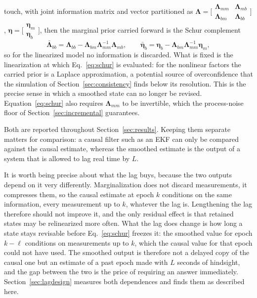 \documentclass{IEEEtaes}
\begin{document}
touch, with joint information matrix and vector partitioned as
$\boldsymbol{\Lambda}=\big[\begin{smallmatrix}\boldsymbol{\Lambda}_{mm}&\boldsymbol{\Lambda}_{mb}\\
\boldsymbol{\Lambda}_{bm}&\boldsymbol{\Lambda}_{bb}\end{smallmatrix}\big]$,
$\boldsymbol{\eta}=\big[\begin{smallmatrix}\boldsymbol{\eta}_m\\
\boldsymbol{\eta}_b\end{smallmatrix}\big]$, then the marginal prior carried
forward is the Schur complement
\begin{equation}
\bar{\boldsymbol{\Lambda}}_{bb}
=\boldsymbol{\Lambda}_{bb}
-\boldsymbol{\Lambda}_{bm}\boldsymbol{\Lambda}_{mm}^{-1}\boldsymbol{\Lambda}_{mb},
\qquad
\bar{\boldsymbol{\eta}}_{b}
=\boldsymbol{\eta}_{b}
-\boldsymbol{\Lambda}_{bm}\boldsymbol{\Lambda}_{mm}^{-1}\boldsymbol{\eta}_{m},
\label{eq:schur}
\end{equation}
so for the linearized model no information is discarded. What is fixed is
the linearization at which Eq.~\eqref{eq:schur} is evaluated: for the
nonlinear factors the carried prior is a Laplace approximation, a potential
source of overconfidence that the simulation of
Section~\ref{sec:consistency} finds below its resolution. This is the
precise sense in which a smoothed
state can no longer be revised. Equation~\eqref{eq:schur} also requires
$\boldsymbol{\Lambda}_{mm}$ to be invertible, which the process-noise floor
of Section~\ref{sec:incremental} guarantees.

Both are reported throughout Section~\ref{sec:results}. Keeping them separate
matters for comparison: a causal filter such as an EKF can only be compared
against the causal estimate, whereas the smoothed estimate is the output of a
system that is allowed to lag real time by $L$.

It is worth being precise about what the lag buys, because the two outputs
depend on it very differently. Marginalization does not discard measurements,
it compresses them, so the causal estimate at epoch $k$ conditions on the same
information, every measurement up to $k$, whatever the lag is. Lengthening the
lag therefore should not improve it, and the only residual effect is that
retained states may be relinearized more often. What the lag does change is
how long a state stays revisable before Eq.~\eqref{eq:schur} freezes it: the
smoothed value for epoch $k-\ell$ conditions on measurements up to $k$, which
the causal value for that epoch could not have used. The smoothed output is
therefore not a delayed copy of the causal one but an estimate of a past epoch
made with $L$ seconds of hindsight, and the gap between the two is the price
of requiring an answer immediately. Section~\ref{sec:lagdesign} measures both
dependences and finds them as described here.
\end{document}
